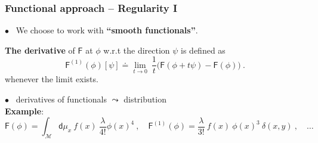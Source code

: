 \documentclass[9pt]{beamer}
\newcommand{\Mcal}{\mathcal{M}}
\newcommand{\Fsf}{\mathsf{F}}
\newcommand{\dsf}{\mathsf{d}}
\begin{document}
\begin{frame}

\frametitle{Functional approach -- Regularity I}

\vfill

$\bullet$ \ We choose to work with \textbf{``smooth functionals''}. 

\vfill

\begin{block}{\vspace*{-3ex}}
\textbf{The derivative} of $\Fsf$ at $\phi$ w.r.t the direction $\psi$ is defined as 
\begin{equation*}%
\Fsf^{(1)}(\phi)[\psi] \doteq \lim_{t \to 0} \ \frac{1}{t} \bigg( \Fsf(\phi + t \psi) - \Fsf(\phi) \bigg) \ .
\end{equation*}
whenever the limit exists. 
\end{block}

\vfill

$\bullet$ \ derivatives of functionals $\leadsto$ distribution \\
\hspace*{8pt} \textbf{Example}: 
\begin{equation*}
\Fsf(\phi) = \int_\Mcal \dsf\mu_x \ f(x) \ \frac{\lambda}{4!} \phi(x)^4 \ , \quad \Fsf^{(1)}(\phi) =  \frac{\lambda}{3!} \ f(x) \ \phi(x)^3 \ \delta(x,y) \ , \quad \dots
\end{equation*}

\vfill

\end{frame}

\end{document}
